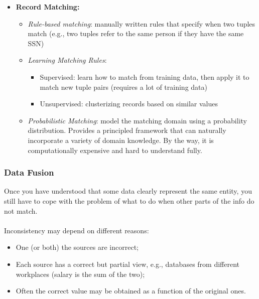 \documentclass[10pt,a4paper]{article}
\newcommand{\nline}{\\~\\}
\begin{document}
\begin{justify}
\begin{itemize}
\begin{itemize}
	\end{itemize}
	\item \textbf{Record Matching:}
	\begin{itemize}
		\item \textit{Rule-based matching}: manually written rules that specify when two tuples match (e.g., two tuples refer to the same person if they have the same SSN)
		\item \textit{Learning Matching Rules}: 
		\begin{itemize}
			\item Supervised: learn how to match from training data, then apply it to match new tuple pairs (requires a lot of training data)
			\item Unsupervised: clusterizing records based on similar values
		\end{itemize}
		\item \textit{Probabilistic Matching}: model the matching domain using a probability distribution. Provides a principled framework that can naturally incorporate a variety of domain knowledge. By the way, it is computationally expensive and hard to understand fully.
	\end{itemize}
\end{itemize}
\end{justify}
\subsubsection{Data Fusion}
\begin{justify}
Once you have understood that some data clearly represent the same entity, you still have to cope with the problem of what to do when other parts of the info do not match. \nline
Inconsistency may depend on different reasons:
\begin{itemize}
	\item One (or both) the sources are incorrect;
	\item Each source has a correct but partial view, e.g., databases from different workplaces (salary is the sum of the two);
	\item Often the correct value may be obtained as a function of the original ones.
\end{itemize}
\end{justify}
\pagebreak
\end{document}
